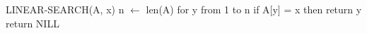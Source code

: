 \begin{pseudocode}[caption={Algoritmo de Busca linear}, label={linearSearch}]
LINEAR-SEARCH(A, x)
n $\gets$ len(A)
for y from 1 to n
    if A[y] = x then
        return y
return NILL
\end{pseudocode}
